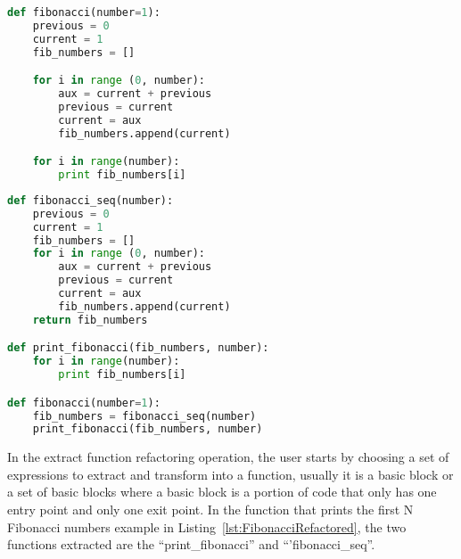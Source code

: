 



\begin{lstlisting}[frame=single, caption=Fibonacci function first implementation, label={lst:Fibonacci}, language=Python]
def fibonacci(number=1):
	previous = 0
	current = 1
	fib_numbers = []

	for i in range (0, number):
		aux = current + previous
		previous = current
		current = aux
		fib_numbers.append(current)

	for i in range(number):
		print fib_numbers[i]
\end{lstlisting}


\begin{lstlisting}[frame=single, caption=Fibonacci function after using extract function, label={lst:FibonacciRefactored}, language=Python]
def fibonacci_seq(number):
	previous = 0
	current = 1
	fib_numbers = []
	for i in range (0, number):
		aux = current + previous
		previous = current
		current = aux
		fib_numbers.append(current)
	return fib_numbers

def print_fibonacci(fib_numbers, number):
	for i in range(number):
		print fib_numbers[i]

def fibonacci(number=1):
	fib_numbers = fibonacci_seq(number)
	print_fibonacci(fib_numbers, number)
\end{lstlisting}


In the extract function refactoring operation, the user starts by choosing a set of expressions to extract and transform into a function, usually it is a  basic block or a set of basic blocks where a basic block is a portion of code that only has one entry point and only one exit point.
In the function that prints the first N Fibonacci numbers example in Listing~\ref{lst:FibonacciRefactored}, the two functions extracted are the ``print\_fibonacci'' and ``'fibonacci\_seq''.

